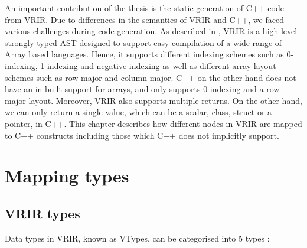 An important contribution of the thesis is the static generation of C++ code from VRIR. Due to differences in the semantics of VRIR and C++, we faced various challenges during code generation. As described in , VRIR is a high level strongly typed AST designed to support easy compilation of a wide range of Array based languages. Hence, it supports different indexing schemes such as 0-indexing, 1-indexing and negative indexing as well as different array layout schemes such as row-major and column-major. C++ on the other hand does not have an in-built support for arrays, and only supports 0-indexing and a row major layout. Moreover, VRIR also supports multiple returns. On the other hand, we can only return a single value, which can be a scalar, class, struct or a pointer, in C++. This chapter describes how different nodes in VRIR are mapped to C++ constructs including those which C++ does not implicitly support.
\section{Mapping types}
\subsection{VRIR types}
Data types in VRIR, known as VTypes, can be categorised into 5 types :
